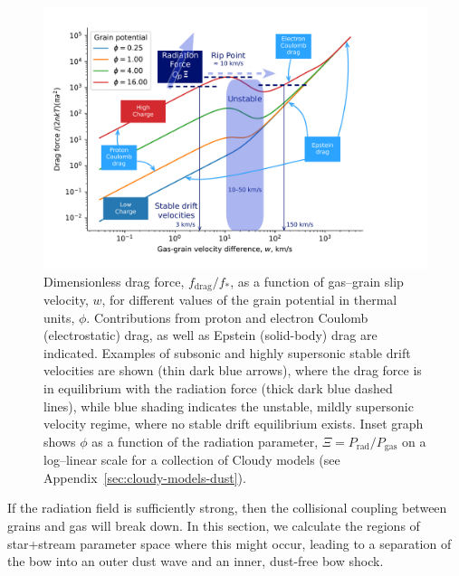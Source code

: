 \message{ !name(dusty-bow-wave.tex)}\documentclass[useAMS, usenatbib, a4paper]{mnras}
\newcommand\drag{\ensuremath{_{\text{drag}}}}
\begin{document}
\begin{figure}
  \includegraphics[width=\linewidth]{figs/gas-grain-drag-photoionized}
  \caption{Dimensionless drag force, \(f\drag / f_*\), as a function
    of gas--grain slip velocity, \(w\), for different values of the
    grain potential in thermal units, \(\phi\).  Contributions from
    proton and electron Coulomb (electrostatic) drag, as well as
    Epstein (solid-body) drag are indicated.  Examples of subsonic and
    highly supersonic stable drift velocities are shown (thin dark
    blue arrows), where the drag force is in equilibrium with the
    radiation force (thick dark blue dashed lines), while blue shading
    indicates the unstable, mildly supersonic velocity regime, where
    no stable drift equilibrium exists.  Inset graph shows \(\phi\) as a
    function of the radiation parameter,
    \(\Xi = P_{\mathrm{rad}} / P_{\mathrm{gas}}\) on a log--linear scale
    for a collection of Cloudy models (see
    Appendix~\ref{sec:cloudy-models-dust}).}
  \label{fig:gas-grain-drag-photoionized}
\end{figure}





If the radiation field is sufficiently strong, then the collisional
coupling between grains and gas will break down.  In this section, we
calculate the regions of star+stream parameter space where this might
occur, leading to a separation of the bow into an outer dust wave and
an inner, dust-free bow shock.
\end{document}
